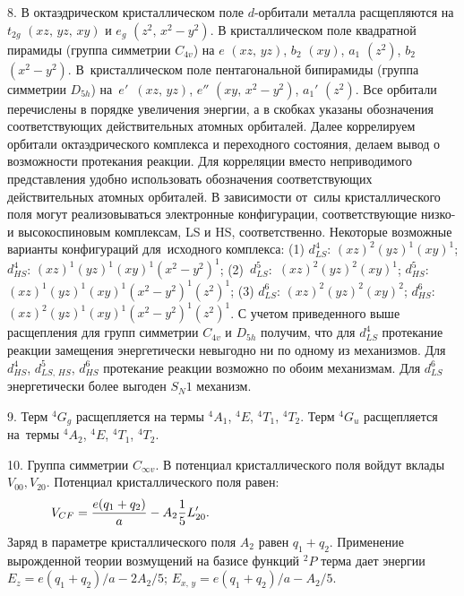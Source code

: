 8. В октаэдрическом кристаллическом поле $d$-орбитали металла расщепляются на $t_{2g}$ $(xz,\,yz,\,xy)$ и $e_g$ $(z^2,\,x^2-y^2)$. В кристаллическом поле квадратной пирамиды (группа симметрии $C_{4v}$) на $e$ $(xz,\,yz)$, $b_2$ $(xy)$, $a_1$ $(z^2)$, $b_2$ $(x^2-y^2)$. В~кристаллическом поле пентагональной бипирамиды (группа симметрии $D_{5h}$) на~$e'$~$(xz,\,yz)$, $e''$ $(xy,\,x^2-y^2)$, $a_1'$ $(z^2)$. Все орбитали перечислены в порядке увеличения энергии, а в скобках указаны обозначения соответствующих действительных атомных орбиталей. Далее коррелируем орбитали октаэдрического комплекса и переходного состояния, делаем вывод о возможности протекания реакции. Для корреляции вместо неприводимого представления удобно использовать обозначения соответствующих действительных атомных орбиталей. В зависимости от~силы кристаллического поля могут реализовываться электронные конфигурации, соответствующие низко- и высокоспиновым комплексам, LS и HS, соответственно. Некоторые возможные варианты конфигураций для~исходного комплекса: (1) $d^4_{LS}$: $(xz)^2 (yz)^1 (xy)^1$; $d^4_{HS}$: $(xz)^1 (yz)^1 (xy)^1 (x^2-y^2)^1$; (2)~$d^5_{LS}$:~$(xz)^2 (yz)^2 (xy)^1$; $d^5_{HS}$: $(xz)^1 (yz)^1 (xy)^1 (x^2-y^2)^1 (z^2)^1$; (3) $d^6_{LS}$: $(xz)^2 (yz)^2 (xy)^2$; $d^6_{HS}$:~$(xz)^2 (yz)^1 (xy)^1 (x^2-y^2)^1 (z^2)^1$. С учетом приведенного выше расщепления для групп симметрии $C_{4v}$ и $D_{5h}$ получим, что для $d^4_{LS}$ протекание реакции замещения энергетически невыгодно ни по одному из механизмов. Для $d^4_{HS}$, $d^5_{LS,\,HS}$, $d^6_{HS}$ протекание реакции возможно по обоим механизмам. Для $d^6_{LS}$ энергетически более выгоден $S_{N}1$ механизм.\par
9. Терм $^4G_g$ расщепляется на термы $^4A_1$, $^4E$, $^4T_1$, $^4T_2$. Терм $^4G_u$ расщепляется на~термы $^4A_2$, $^4E$, $^4T_1$, $^4T_2$.\par\par
10. Группа симметрии $C_{\infty v}$. В потенциал кристаллического поля войдут вклады $V_{00}, V_{20}$. Потенциал кристаллического поля равен:
\begin{equation*}
\begin{aligned}
& V_{CF}= \dfrac{e(q_1+q_2)}{a} - A_2 \dfrac{1}{5}L_{20}'. \hspace{54mm}
\end{aligned}
\end{equation*}
Заряд в параметре кристаллического поля $A_2$ равен $q_1+q_2$. Применение вырожденной теории возмущений на базисе функций $^2P$ терма дает энергии $E_{z} = e(q_1+q_2)/a - 2A_2/5$; $E_{x,\, y} =e(q_1+q_2)/a - A_2/5$.\par

